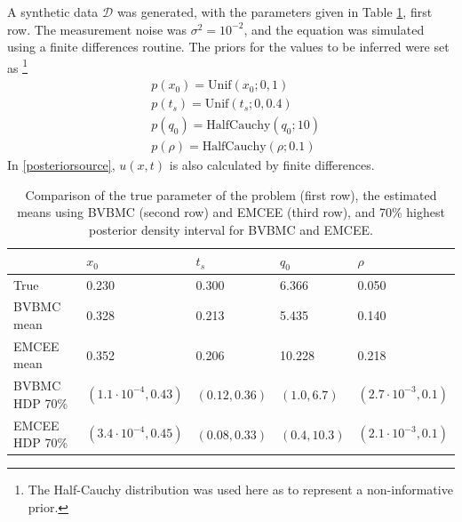 A synthetic data $\mathcal{D}$ was generated, with the parameters given in Table \ref{sourcetable}, first row. The measurement noise was $\sigma^2 = 10^{-2}$, and the equation was simulated using a finite differences routine. The priors for the values to be inferred were set as \footnote{The Half-Cauchy distribution was used here as to represent a non-informative prior.}
\begin{equation}
\begin{split}
& p(x_0) = \text{Unif}(x_0;0,1) \\ 
& p(t_s) = \text{Unif}(t_s;0,0.4) \\
& p(q_0) = \text{HalfCauchy}(q_0;10) \\ 
& p(\rho) = \text{HalfCauchy}(\rho;0.1)
\end{split}
\end{equation}
In \eqref{posteriorsource}, $u(x,t)$ is also calculated by finite differences.

\begin{table}[h]
	\centering
	\begin{tabular}{l|l|l|l|l|}
		\cline{2-5}
		& $x_0$ & $t_s$ & $q_0$  & $\rho$ \\ \hline
		\multicolumn{1}{|l|}{True}  & 0.230 & 0.300 & 6.366  & 0.050  \\ \hline
		\multicolumn{1}{|l|}{BVBMC mean} & 0.328 & 0.213 & 5.435  & 0.140  \\ \hline
		\multicolumn{1}{|l|}{EMCEE mean} & 0.352 & 0.206 & 10.228 & 0.218  \\ \hline
		\multicolumn{1}{|l|}{BVBMC HDP 70\%} & $(1.1 \cdot 10^{-4},0.43)$ & $(0.12, 0.36)$ & $(1.0, 6.7)$ & $(2.7 \cdot 10^{-3}, 0.1)$  \\ \hline
		\multicolumn{1}{|l|}{EMCEE HDP 70\%} & $(3.4 \cdot 10^{-4}, 0.45)$ & $(0.08, 0.33)$ & $(0.4,10.3)$ & $(2.1 \cdot 10^{-3}, 0.1)$  \\ \hline
	\end{tabular}
	\caption{\label{sourcetable} Comparison of the true parameter of the problem (first row), the estimated means using BVBMC (second row) and EMCEE (third row), and 70\% highest posterior density interval for BVBMC and EMCEE.}
\end{table}

